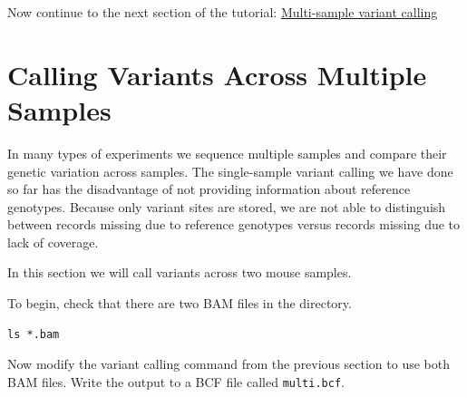 \documentclass[11pt]{article}
\makeatletter
\newcommand{\boxspacing}{\kern\kvtcb@left@rule\kern\kvtcb@boxsep}
\newcommand{\prompt}[4]{

        {\ttfamily\llap{{\color{blue}\LARGE\faKeyboardO\hspace{3pt}#4}}\vspace{-\baselineskip}}
    }
\makeatother
\begin{document}
    \begin{tcolorbox}[breakable, size=fbox, boxrule=1pt, pad at break*=1mm,colback=cellbackground, colframe=cellborder]
\prompt{In}{incolor}{ }{\boxspacing}
\begin{Verbatim}[commandchars=\\\{\}]

\end{Verbatim}
\end{tcolorbox}

    Now continue to the next section of the tutorial:
\href{multi-sample-calling.ipynb}{Multi-sample variant calling}





\newpage





    \hypertarget{calling-variants-across-multiple-samples}{%
\section{Calling Variants Across Multiple
Samples}\label{calling-variants-across-multiple-samples}}

In many types of experiments we sequence multiple samples and compare
their genetic variation across samples. The single-sample variant
calling we have done so far has the disadvantage of not providing
information about reference genotypes. Because only variant sites are
stored, we are not able to distinguish between records missing due to
reference genotypes versus records missing due to lack of coverage.

In this section we will call variants across two mouse samples.

To begin, check that there are two BAM files in the directory.

    \begin{tcolorbox}[breakable, size=fbox, boxrule=1pt, pad at break*=1mm,colback=cellbackground, colframe=cellborder]
\prompt{In}{incolor}{ }{\boxspacing}
\begin{Verbatim}[commandchars=\\\{\}]
ls *.bam
\end{Verbatim}
\end{tcolorbox}

    Now modify the variant calling command from the previous section to use
both BAM files. Write the output to a BCF file called
\texttt{multi.bcf}.
\end{document}
